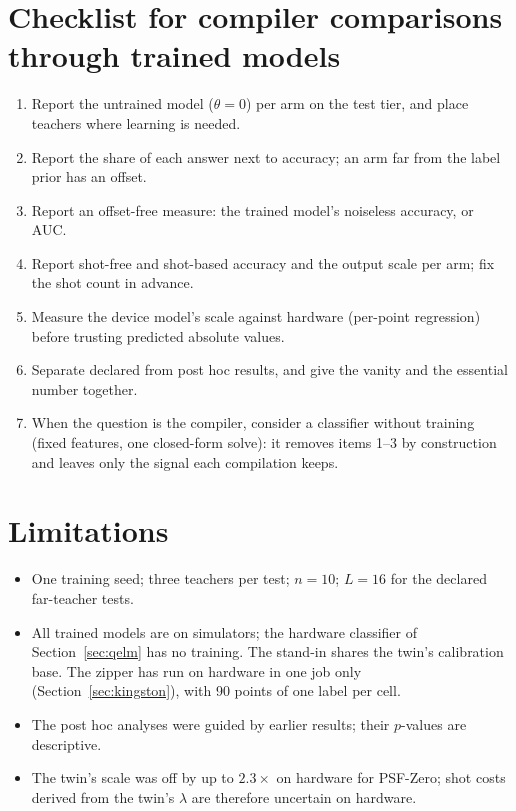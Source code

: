 \documentclass[11pt]{article}
\begin{document}
\section{Checklist for compiler comparisons through trained models}

\begin{enumerate}
\item Report the untrained model ($\theta = 0$) per arm on the test tier, and place teachers where learning is needed.
\item Report the share of each answer next to accuracy; an arm far from the label prior has an offset.
\item Report an offset-free measure: the trained model's noiseless accuracy, or AUC.
\item Report shot-free and shot-based accuracy and the output scale per arm; fix the shot count in advance.
\item Measure the device model's scale against hardware (per-point regression) before trusting predicted absolute
values.
\item Separate declared from post hoc results, and give the vanity and the essential number together.
\item When the question is the compiler, consider a classifier without training (fixed features, one closed-form
solve): it removes items 1--3 by construction and leaves only the signal each compilation keeps.
\end{enumerate}

\section{Limitations}

\begin{itemize}
\item One training seed; three teachers per test; $n = 10$; $L = 16$ for the declared far-teacher tests.
\item All trained models are on simulators; the hardware classifier of Section~\ref{sec:qelm} has no training. The
stand-in shares the twin's calibration base. The zipper has run on
hardware in one job only (Section~\ref{sec:kingston}), with 90 points of one label per cell.
\item The post hoc analyses were guided by earlier results; their $p$-values are descriptive.
\item The twin's scale was off by up to $2.3\times$ on hardware for PSF-Zero; shot costs derived from the twin's
$\lambda$ are therefore uncertain on hardware.
\end{itemize}
\end{document}
